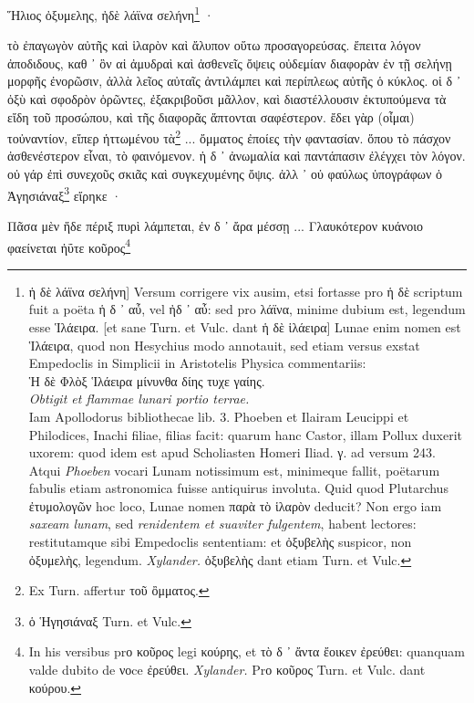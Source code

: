 \documentclass[a4paper, 11pt, oneside, polutonikogreek, german]{article}
\begin{document}
Ἥλιος ὀξυμελης, ἠδὲ λάϊνα σελήνη\footnote{ἡ δὲ λάϊνα σελήνη] Versum corrigere vix ausim, etsi fortasse pro ἡ δὲ scriptum fuit a poëta ἡ δ ᾽ αὖ, vel ἠδ ᾽ αὖ: sed pro λάϊνα, minime dubium est, legendum esse Ἱλάειρα. [et sane Turn. et Vulc. dant ἡ δὲ ἱλάειρα] Lunae enim nomen est Ἱλάειρα, quod non Hesychius modo annotauit, sed etiam versus exstat Empedoclis in Simplicii in Aristotelis Physica commentariis:\\\hspace*{5mm}Ἡ δὲ Φλὸξ Ἱλάειρα μίνυνθα δίης τυχε γαίης.\\\hspace*{5mm}\emph{Obtigit et flammae lunari portio terrae.}\\\hspace*{5mm}Iam Apollodorus bibliothecae lib. 3. Phoeben et Ilairam Leucippi et Philodices, Inachi filiae, filias facit: quarum hanc Castor, illam Pollux duxerit uxorem: quod idem est apud Scholiasten Homeri Iliad. γ. ad versum 243. Atqui \emph{Phoeben} vocari Lunam notissimum est, minimeque fallit, poëtarum fabulis etiam astronomica fuisse antiquirus involuta. Quid quod Plutarchus ἐτυμολογῶν hoc loco, Lunae nomen παρὰ τὸ ἱλαρὸν deducit? Non ergo iam \emph{saxeam lunam}, sed \emph{renidentem et suaviter fulgentem}, habent lectores: restitutamque sibi Empedoclis sententiam: et ὀξυβελὴς suspicor, non ὀξυμελὴς, legendum. \emph{Xylander.} ὀξυβελὴς dant etiam Turn. et Vulc.} ·

τὸ ἐπαγωγὸν αὐτῆς καὶ ἱλαρὸν καὶ ἄλυπον οὕτω προσαγορεύσας. ἔπειτα λόγον ἀποδιδους, καθ ᾽ ὃν αἱ ἀμυδραὶ καὶ ἀσθενεῖς ὄψεις οὐδεμίαν διαφορὰν ἐν τῇ σελήνῃ μορφῆς ἐνορῶσιν, ἀλλὰ λεῖος αὐταῖς ἀντιλάμπει καὶ περίπλεως αὐτῆς ὁ κύκλος. οἱ δ ᾽ ὀξὺ καὶ σφοδρὸν ὁρῶντες, ἐξακριβοῦσι μᾶλλον, καὶ διαστέλλουσιν ἐκτυπούμενα τὰ εἴδη τοῦ προσώπου, καὶ τῆς διαφορᾶς ἅπτονται σαφέστερον. ἔδει γὰρ (οἶμαι) τοὐναντίον, εἴπερ ἡττωμένου τὰ\footnote{Ex Turn. affertur τοῦ ὂμματος.} ... ὄμματος ἐποίες τὴν φαντασίαν. ὅπου τὸ πάσχον ἀσθενέστερον εἶναι, τὸ φαινόμενον. ἡ δ ᾽ ἀνωμαλία καὶ παντάπασιν ἐλέγχει τὸν λόγον. οὐ γάρ ἐπὶ συνεχοῦς σκιᾶς καὶ συγκεχυμένης ὄψις. ἀλλ ᾽ οὐ φαύλως ὑπογράφων ὁ Ἀγησιάναξ\footnote{ὁ Ἡγησιάναξ Turn. et Vulc.} εἴρηκε ·

Πᾶσα μὲν ἥδε πέριξ πυρὶ λάμπεται, ἐν δ ᾽ ἄρα μέσσῃ ... Γλαυκότερον κυάνοιο φαείνεται ἠΰτε κοῦρος\footnote{In his versibus prο κοῦρος legi κούρης, et τὸ δ ᾽ ἄντα ἔοικεν ἐρεύθει: quanquam valde dubito de νοce ἐρεύθει. \emph{Xylander.} Prο κοῦρος Turn. et Vulc. dant κούρου.}
\end{document}
